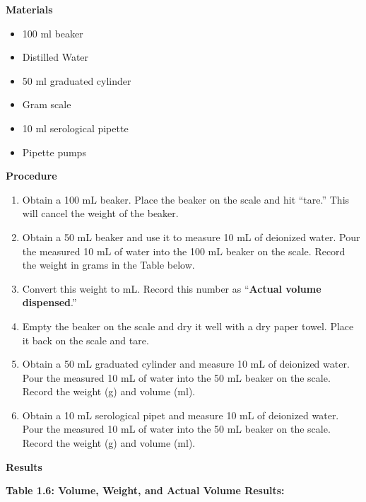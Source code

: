 \documentclass[
  letterpaper,
  DIV=11,
  numbers=noendperiod]{scrreprt}
\begin{document}
\textbf{Materials}

\begin{itemize}
\item
  100 ml beaker
\item
  Distilled Water
\item
  50 ml graduated cylinder
\item
  Gram scale
\item
  10 ml serological pipette
\item
  Pipette pumps
\end{itemize}

\textbf{Procedure}

\begin{enumerate}
\def\labelenumi{\arabic{enumi}.}
\item
  Obtain a 100 mL beaker. Place the beaker on the scale and hit
  ``tare.'' This will cancel the weight of the beaker.
\item
  Obtain a 50 mL beaker and use it to measure 10 mL of deionized water.
  Pour the measured 10 mL of water into the 100 mL beaker on the scale.
  Record the weight in grams in the Table below.
\item
  Convert this weight to mL. Record this number as ``\textbf{Actual
  volume dispensed}.''
\item
  Empty the beaker on the scale and dry it well with a dry paper towel.
  Place it back on the scale and tare.
\item
  Obtain a 50 mL graduated cylinder and measure 10 mL of deionized
  water. Pour the measured 10 mL of water into the 50 mL beaker on the
  scale. Record the weight (g) and volume (ml).
\item
  Obtain a 10 mL serological pipet and measure 10 mL of deionized water.
  Pour the measured 10 mL of water into the 50 mL beaker on the scale.
  Record the weight (g) and volume (ml).
\end{enumerate}

\textbf{Results}

\textbf{Table 1.6: Volume, Weight, and Actual Volume Results:}
\end{document}
